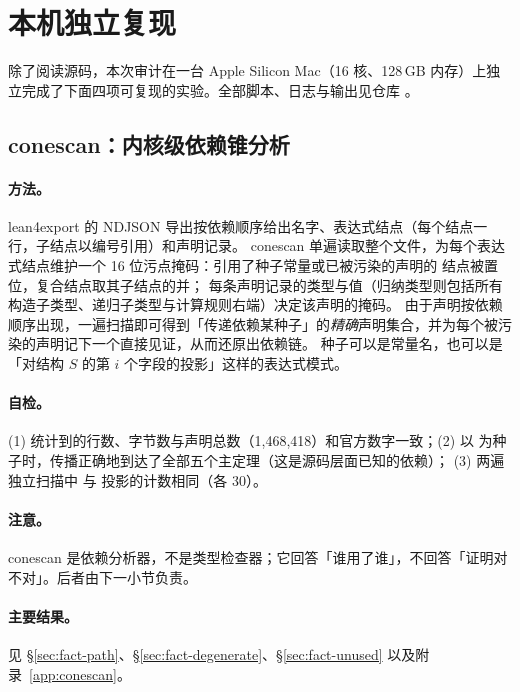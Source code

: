 \section{本机独立复现}
\label{sec:replication}

除了阅读源码，本次审计在一台 Apple Silicon Mac（16 核、128\,GB 内存）上独立完成了下面四项可复现的实验。全部脚本、日志与输出见仓库 。

\subsection{conescan：内核级依赖锥分析}
\label{sec:conescan}

\paragraph{方法。}lean4export 的 NDJSON 导出按依赖顺序给出名字、表达式结点（每个结点一行，子结点以编号引用）和声明记录。
conescan 单遍读取整个文件，为每个表达式结点维护一个 16 位污点掩码：引用了种子常量或已被污染的声明的  结点被置位，复合结点取其子结点的并；
每条声明记录的类型与值（归纳类型则包括所有构造子类型、递归子类型与计算规则右端）决定该声明的掩码。
由于声明按依赖顺序出现，一遍扫描即可得到「传递依赖某种子」的\emph{精确}声明集合，并为每个被污染的声明记下一个直接见证，从而还原出依赖链。
种子可以是常量名，也可以是「对结构 $S$ 的第 $i$ 个字段的投影」这样的表达式模式。

\paragraph{自检。}(1) 统计到的行数、字节数与声明总数（1,468,418）和官方数字一致；(2) 以  为种子时，传播正确地到达了全部五个主定理（这是源码层面已知的依赖）；
(3) 两遍独立扫描中  与  投影的计数相同（各 30）。

\paragraph{注意。}conescan 是依赖分析器，不是类型检查器；它回答「谁用了谁」，不回答「证明对不对」。后者由下一小节负责。

\paragraph{主要结果。}见 \S\ref{sec:fact-path}、\S\ref{sec:fact-degenerate}、\S\ref{sec:fact-unused} 以及附录~\ref{app:conescan}。\scanThreeSummary

